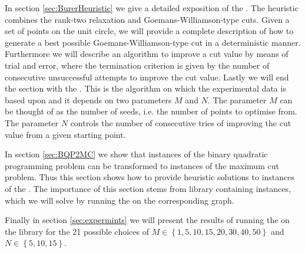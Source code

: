 \documentclass[12pt,a4paper]{article}
\theoremstyle{mythm}
\begin{document}
In section \ref{sec:BurerHeuristic} we give a detailed exposition of the \BH.
The heuristic combines the rank-two relaxation and Goemans-Williamson-type cuts. 
Given a set of points on the unit circle, we will provide a complete description of how to generate a best possible Goemans-Williamson-type cut in a deterministic manner. 
Furthermore we will describe an algorithm to improve a cut value by means of trial and error, where the termination criterion is given by the number of consecutive unsuccessful
attempts to improve the cut value.
Lastly we will end the section with the \BH.
This is the algorithm on which the experimental data is based upon and it depends on two parameters $ M $ and $ N $. The parameter $ M $ can be thought of as the number of
seeds, i.e. the number of points to optimise from. The parameter $ N $ controls the number of consecutive tries of improving the cut value from a given starting point.

In section \ref{sec:BQP2MC} we show that instances of the binary quadratic programming problem can be transformed to instances of the maximum cut problem.
Thus this section shows how to provide heuristic solutions to instances of the \BQP.
The importance of this section stems from library \cite{MallachLibrary} containing \BQP instances, which we will solve by running the \BH on the corresponding \MCP graph.

Finally in section \ref{sec:expermints} we will present the results of running the \BH on the library \cite{MallachLibrary} for the 21 possible choices of $ M \in
\left\{ 1, 5, 10, 15, 20, 30, 40, 50 \right\}  $ and $ N \in \left\{ 5, 10 , 15 \right\}  $.

\newpage
\end{document}
